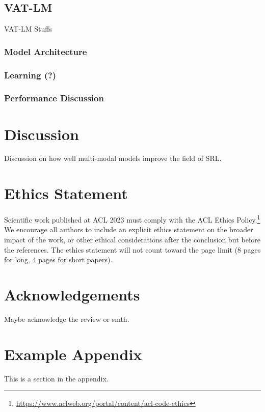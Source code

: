 \documentclass[11pt]{article}
\begin{document}
\subsection{VAT-LM}

VAT-LM Stuffs

\subsubsection{Model Architecture}
\subsubsection{Learning (?)}
\subsubsection{Performance Discussion}


\section{Discussion}

Discussion on how well multi-modal models improve the field of SRL.

\section*{Ethics Statement}
Scientific work published at ACL 2023 must comply with the ACL Ethics Policy.\footnote{\url{https://www.aclweb.org/portal/content/acl-code-ethics}} We encourage all authors to include an explicit ethics statement on the broader impact of the work, or other ethical considerations after the conclusion but before the references. The ethics statement will not count toward the page limit (8 pages for long, 4 pages for short papers).

\section*{Acknowledgements}
Maybe acknowledge the review or smth.




\appendix

\section{Example Appendix}
\label{sec:appendix}

This is a section in the appendix.
\end{document}
